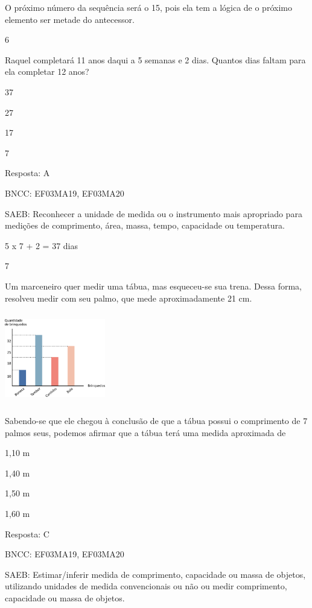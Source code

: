 \begin{escolha}
{\begin{escolha}
{O próximo número da sequência será o 15, pois ela tem a lógica de o próximo
elemento ser metade do antecessor.

\num{6}

Raquel completará 11 anos daqui a 5 semanas e 2 dias. Quantos dias faltam para ela completar 12 anos?

\begin{escolha}
\item
  37
\item
  27
\item
  17
\item
  7
\end{escolha}

Resposta: A

BNCC: EF03MA19, EF03MA20

SAEB: Reconhecer a unidade de medida ou o instrumento mais
apropriado para medições de comprimento, área, massa, tempo, capacidade
ou temperatura.

5 x 7 + 2 = 37 dias

\num{7}

Um marceneiro quer medir uma tábua, mas esqueceu-se sua trena. Dessa
forma, resolveu medir com seu palmo, que mede aproximadamente 21 cm.


\includegraphics[width=1.73077in,height=1.57654in]{media/image119.png}

Sabendo-se que ele chegou à conclusão de que a tábua possui o comprimento
de 7 palmos seus, podemos afirmar que a tábua terá uma medida aproximada
de

\begin{escolha}
\item
  1,10 m
\item
  1,40 m
\item
  1,50 m
\item
  1,60 m
\end{escolha}

Resposta: C

BNCC: EF03MA19, EF03MA20

SAEB: Estimar/inferir medida de comprimento, capacidade ou
massa de objetos, utilizando unidades de medida convencionais ou não ou medir comprimento, capacidade
ou massa de objetos.

}
\end{escolha}}
\end{escolha}
